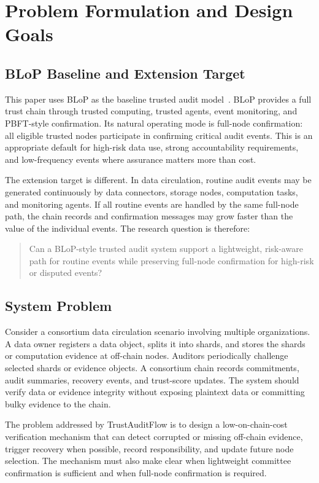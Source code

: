 \section{Problem Formulation and Design Goals}

\subsection{BLoP Baseline and Extension Target}

This paper uses BLoP as the baseline trusted audit model~\cite{Zhang2025BloPAT}. BLoP provides a full trust chain through trusted computing, trusted agents, event monitoring, and PBFT-style confirmation. Its natural operating mode is full-node confirmation: all eligible trusted nodes participate in confirming critical audit events. This is an appropriate default for high-risk data use, strong accountability requirements, and low-frequency events where assurance matters more than cost.

The extension target is different. In data circulation, routine audit events may be generated continuously by data connectors, storage nodes, computation tasks, and monitoring agents. If all routine events are handled by the same full-node path, the chain records and confirmation messages may grow faster than the value of the individual events. The research question is therefore:

\begin{quote}
Can a BLoP-style trusted audit system support a lightweight, risk-aware path for routine events while preserving full-node confirmation for high-risk or disputed events?
\end{quote}

\subsection{System Problem}

Consider a consortium data circulation scenario involving multiple organizations. A data owner registers a data object, splits it into shards, and stores the shards or computation evidence at off-chain nodes. Auditors periodically challenge selected shards or evidence objects. A consortium chain records commitments, audit summaries, recovery events, and trust-score updates. The system should verify data or evidence integrity without exposing plaintext data or committing bulky evidence to the chain.

The problem addressed by TrustAuditFlow is to design a low-on-chain-cost verification mechanism that can detect corrupted or missing off-chain evidence, trigger recovery when possible, record responsibility, and update future node selection. The mechanism must also make clear when lightweight committee confirmation is sufficient and when full-node confirmation is required.

